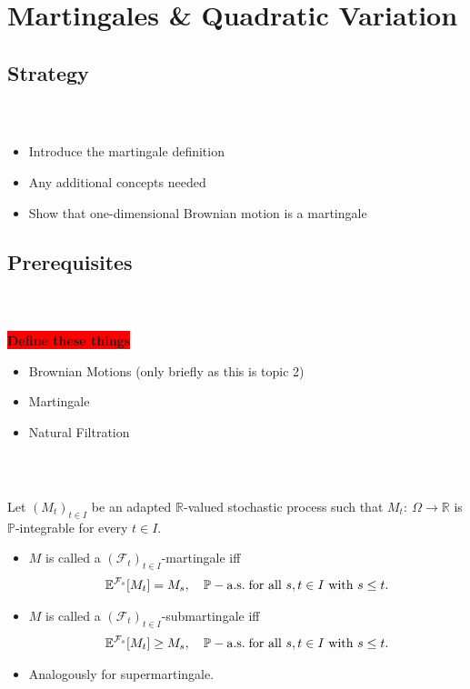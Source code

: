 \documentclass{beamer}
\numberwithin{equation}{section}
\newcommand{\task}[1]{
    \begin{center}
        \colorbox{red}{
            \textsf{
                \textbf{#1}
            }
        }
    \end{center}
}
\newenvironment{frame2}{\begin{frame}\frametitle{{\normalsize \secname} \\ {\large \subsecname}}}{\end{frame}}
\begin{document}
\section{Martingales \& Quadratic Variation}

\subsection{Strategy}
\begin{frame2}
    \begin{itemize}
        \item Introduce the martingale definition
        \item Any additional concepts needed
        \item Show that one-dimensional Brownian motion is a martingale
    \end{itemize}
 \end{frame2}

\subsection{Prerequisites}

\begin{frame2}
    \task{Define these things}
    \begin{itemize}
        \item Brownian Motions (only briefly as this is topic 2)
        \item Martingale
        \item Natural Filtration
    \end{itemize}
\end{frame2}

\begin{frame2}
    Let $(M_t)_{t\in I}$ be an adapted $\mathbb{R}$-valued stochastic process such that $M_t: \ \Omega \rightarrow \mathbb{R}$ is $\mathbb{P}$-integrable for every $t\in I$.
    \begin{itemize}
        \item<-1> $M$ is called a $(\mathcal{F}_t)_{t\in I}$-martingale iff
        \begin{align}
            \mathbb{E}^{\mathcal{F}_s}[M_t] = M_s, \quad \mathbb{P}-\text{a.s.\! for all } s,t \in I \text{ with } s\leq t.
        \end{align}
        \item<2-> $M$ is called a $(\mathcal{F}_t)_{t\in I}$-submartingale iff
        \begin{align}
            \mathbb{E}^{\mathcal{F}_s}[M_t] \geq M_s, \quad \mathbb{P}-\text{a.s.\! for all } s,t \in I \text{ with } s\leq t.
        \end{align}
        \item<3-> Analogously for supermartingale.
    \end{itemize}
\end{frame2}
\end{document}
